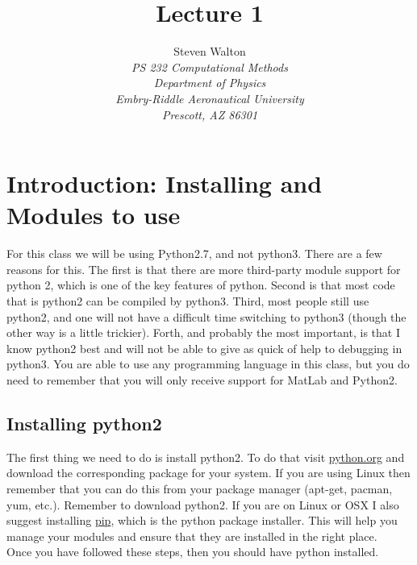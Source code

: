 \documentclass[11pt]{article}   %
\title{Lecture 1}
\author{Steven Walton\\     %
\textit{PS 232 Computational Methods}\\
\textit{Department of Physics}\\
\textit{Embry-Riddle Aeronautical University}\\
\textit{Prescott, AZ   86301}}
\begin{document}
\maketitle

\section*{Introduction: Installing and Modules to use}
For this class we will be using Python2.7, and not python3.  There are a few reasons for this.  The first is that there are more third-party module support for python 2, which is one of the
key features of python.  Second is that most code that is python2 can be compiled by python3.  Third, most people still use python2, and one will not have a difficult time switching to
python3 (though the other way is a little trickier).  Forth, and probably the most important, is that I know python2 best and will not be able to give as quick of help to debugging in
python3.  You are able to use any programming language in this class, but you do need to remember that you will only receive support for MatLab and Python2.
\subsection*{Installing python2}
The first thing we need to do is install python2.  To do that visit \href{https://www.python.org/download/releases/2.7.6/}{python.org} and download the corresponding package for your system.
If you are using Linux then remember that you can do this from your package manager (apt-get, pacman, yum, etc.).  Remember to download python2.  If you are on Linux or OSX I also suggest installing \href{https://pypi.python.org/pypi/pip}{pip}, which is the python package installer.  This will help you manage your modules and ensure that they are installed in the right place.
\\
Once you have followed these steps, then you should have python installed.
\end{document}
